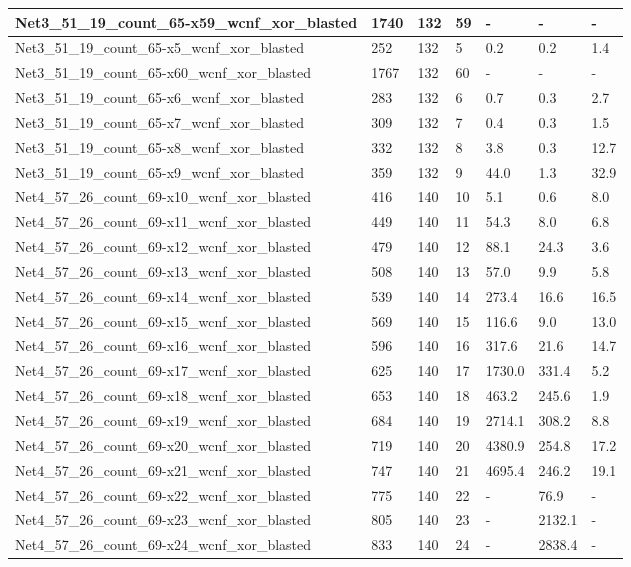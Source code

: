 \begin{scriptsize}
\begin{longtable}{|p{5cm}|l|l|l|l|l|l|}
Net3\_51\_19\_count\_65-x59\_wcnf\_xor\_blasted&1740&132&59&-&-&- \\ \hline 
Net3\_51\_19\_count\_65-x5\_wcnf\_xor\_blasted&252&132&5&0.2&0.2&1.4 \\ \hline 
Net3\_51\_19\_count\_65-x60\_wcnf\_xor\_blasted&1767&132&60&-&-&- \\ \hline 
Net3\_51\_19\_count\_65-x6\_wcnf\_xor\_blasted&283&132&6&0.7&0.3&2.7 \\ \hline 
Net3\_51\_19\_count\_65-x7\_wcnf\_xor\_blasted&309&132&7&0.4&0.3&1.5 \\ \hline 
Net3\_51\_19\_count\_65-x8\_wcnf\_xor\_blasted&332&132&8&3.8&0.3&12.7 \\ \hline 
Net3\_51\_19\_count\_65-x9\_wcnf\_xor\_blasted&359&132&9&44.0&1.3&32.9 \\ \hline 
Net4\_57\_26\_count\_69-x10\_wcnf\_xor\_blasted&416&140&10&5.1&0.6&8.0 \\ \hline 
Net4\_57\_26\_count\_69-x11\_wcnf\_xor\_blasted&449&140&11&54.3&8.0&6.8 \\ \hline 
Net4\_57\_26\_count\_69-x12\_wcnf\_xor\_blasted&479&140&12&88.1&24.3&3.6 \\ \hline 
Net4\_57\_26\_count\_69-x13\_wcnf\_xor\_blasted&508&140&13&57.0&9.9&5.8 \\ \hline 
Net4\_57\_26\_count\_69-x14\_wcnf\_xor\_blasted&539&140&14&273.4&16.6&16.5 \\ \hline 
Net4\_57\_26\_count\_69-x15\_wcnf\_xor\_blasted&569&140&15&116.6&9.0&13.0 \\ \hline 
Net4\_57\_26\_count\_69-x16\_wcnf\_xor\_blasted&596&140&16&317.6&21.6&14.7 \\ \hline 
Net4\_57\_26\_count\_69-x17\_wcnf\_xor\_blasted&625&140&17&1730.0&331.4&5.2 \\ \hline 
Net4\_57\_26\_count\_69-x18\_wcnf\_xor\_blasted&653&140&18&463.2&245.6&1.9 \\ \hline 
Net4\_57\_26\_count\_69-x19\_wcnf\_xor\_blasted&684&140&19&2714.1&308.2&8.8 \\ \hline 
Net4\_57\_26\_count\_69-x20\_wcnf\_xor\_blasted&719&140&20&4380.9&254.8&17.2 \\ \hline 
Net4\_57\_26\_count\_69-x21\_wcnf\_xor\_blasted&747&140&21&4695.4&246.2&19.1 \\ \hline 
Net4\_57\_26\_count\_69-x22\_wcnf\_xor\_blasted&775&140&22&-&76.9&- \\ \hline 
Net4\_57\_26\_count\_69-x23\_wcnf\_xor\_blasted&805&140&23&-&2132.1&- \\ \hline 
Net4\_57\_26\_count\_69-x24\_wcnf\_xor\_blasted&833&140&24&-&2838.4&- \\ \hline 

\end{longtable}
\end{scriptsize}
